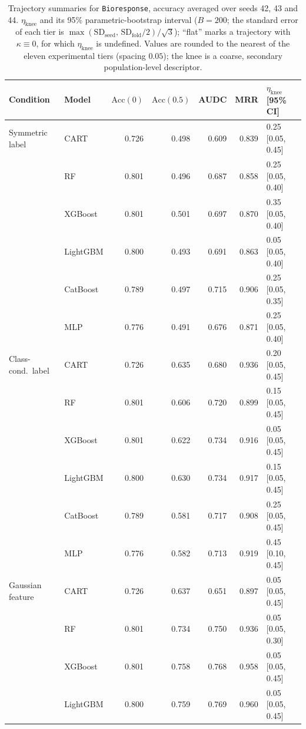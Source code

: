 \begin{table}[p]
\centering
\scriptsize
\setlength{\tabcolsep}{3.5pt}
\caption{Trajectory summaries for \texttt{Bioresponse}, accuracy averaged over seeds 42, 43 and 44. $\eta_{\mathrm{knee}}$ and its 95\% parametric-bootstrap interval ($B=200$; the standard error of each tier is $\max(\mathrm{SD}_{\mathrm{seed}},\,\mathrm{SD}_{\mathrm{fold}}/2)/\sqrt3$); ``flat'' marks a trajectory with $\kappa\equiv 0$, for which $\eta_{\mathrm{knee}}$ is undefined. Values are rounded to the nearest of the eleven experimental tiers (spacing $0.05$); the knee is a coarse, secondary population-level descriptor.}
\label{tab:traj_Bioresponse}
\begin{tabular}{@{}llrrrrl@{}}
\toprule
Condition & Model & $\mathrm{Acc}(0)$ & $\mathrm{Acc}(0.5)$ & AUDC & MRR & $\eta_{\mathrm{knee}}$ [95\% CI] \\
\midrule
Symmetric label & CART & 0.726 & 0.498 & 0.609 & 0.839 & 0.25 [0.05, 0.45] \\
 & RF & 0.801 & 0.496 & 0.687 & 0.858 & 0.25 [0.05, 0.40] \\
 & XGBoost & 0.801 & 0.501 & 0.697 & 0.870 & 0.35 [0.05, 0.40] \\
 & LightGBM & 0.800 & 0.493 & 0.691 & 0.863 & 0.05 [0.05, 0.40] \\
 & CatBoost & 0.789 & 0.497 & 0.715 & 0.906 & 0.25 [0.05, 0.35] \\
 & MLP & 0.776 & 0.491 & 0.676 & 0.871 & 0.25 [0.05, 0.40] \\
\midrule
Class-cond.\ label & CART & 0.726 & 0.635 & 0.680 & 0.936 & 0.20 [0.05, 0.45] \\
 & RF & 0.801 & 0.606 & 0.720 & 0.899 & 0.15 [0.05, 0.45] \\
 & XGBoost & 0.801 & 0.622 & 0.734 & 0.916 & 0.05 [0.05, 0.45] \\
 & LightGBM & 0.800 & 0.630 & 0.734 & 0.917 & 0.15 [0.05, 0.45] \\
 & CatBoost & 0.789 & 0.581 & 0.717 & 0.908 & 0.25 [0.05, 0.45] \\
 & MLP & 0.776 & 0.582 & 0.713 & 0.919 & 0.45 [0.10, 0.45] \\
\midrule
Gaussian feature & CART & 0.726 & 0.637 & 0.651 & 0.897 & 0.05 [0.05, 0.45] \\
 & RF & 0.801 & 0.734 & 0.750 & 0.936 & 0.05 [0.05, 0.30] \\
 & XGBoost & 0.801 & 0.758 & 0.768 & 0.958 & 0.05 [0.05, 0.45] \\
 & LightGBM & 0.800 & 0.759 & 0.769 & 0.960 & 0.05 [0.05, 0.45] \\

\end{tabular}
\end{table}
